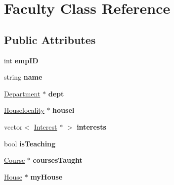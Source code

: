 \hypertarget{classFaculty}{\section{\-Faculty \-Class \-Reference}
\label{classFaculty}
}
\subsection*{\-Public \-Attributes}
\begin{DoxyCompactItemize}
\item 
\hypertarget{classFaculty_a4255e43357559789a47ecef232bbbcc7}{int {\bfseries emp\-I\-D}}\label{classFaculty_a4255e43357559789a47ecef232bbbcc7}

\item 
\hypertarget{classFaculty_a0eb97b036ccf1b3f242b1df2335a48b8}{string {\bfseries name}}\label{classFaculty_a0eb97b036ccf1b3f242b1df2335a48b8}

\item 
\hypertarget{classFaculty_a95ed03d4351f86ea444c0880567248b7}{\hyperlink{classDepartment}{\-Department} $\ast$ {\bfseries dept}}\label{classFaculty_a95ed03d4351f86ea444c0880567248b7}

\item 
\hypertarget{classFaculty_a96c8a3adb45f745e5de1f94d16bdb75b}{\hyperlink{classHouselocality}{\-Houselocality} $\ast$ {\bfseries housel}}\label{classFaculty_a96c8a3adb45f745e5de1f94d16bdb75b}

\item 
\hypertarget{classFaculty_a1bf52a0d14f9cf91c40f327d40c4e22d}{vector$<$ \hyperlink{classInterest}{\-Interest} $\ast$ $>$ {\bfseries interests}}\label{classFaculty_a1bf52a0d14f9cf91c40f327d40c4e22d}

\item 
\hypertarget{classFaculty_ab7bf4d70884383e37e8e2cfbda0fa96a}{bool {\bfseries is\-Teaching}}\label{classFaculty_ab7bf4d70884383e37e8e2cfbda0fa96a}

\item 
\hypertarget{classFaculty_a119eb245ec2107fc359ba1e63a209bce}{\hyperlink{classCourse}{\-Course} $\ast$ {\bfseries courses\-Taught}}\label{classFaculty_a119eb245ec2107fc359ba1e63a209bce}

\item 
\hypertarget{classFaculty_a93106d6d6d002c331bb9009fd475c364}{\hyperlink{classHouse}{\-House} $\ast$ {\bfseries my\-House}}\label{classFaculty_a93106d6d6d002c331bb9009fd475c364}


\end{DoxyCompactItemize}

